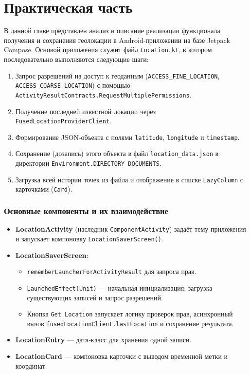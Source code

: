 \chapter*{Практическая часть}

В данной главе представлен анализ и описание реализации функционала получения и сохранения геолокации в Android‑приложении на базе Jetpack Compose. Основой приложения служит файл \texttt{Location.kt}, в котором последовательно выполняются следующие шаги:

\begin{enumerate}
    \item Запрос разрешений на доступ к геоданным (\texttt{ACCESS\_FINE\_LOCATION}, \texttt{ACCESS\_COARSE\_LOCATION}) с помощью \texttt{ActivityResultContracts.RequestMultiplePermissions}.
    \item Получение последней известной локации через \texttt{FusedLocationProviderClient}.
    \item Формирование JSON‑объекта с полями \texttt{latitude}, \texttt{longitude} и \texttt{timestamp}\cite{json_android}.
    \item Сохранение (дозапись) этого объекта в файл \texttt{location\_data.json} в директории \texttt{Environment.DIRECTORY\_DOCUMENTS}.
    \item Загрузка всей истории точек из файла и отображение в списке \texttt{LazyColumn} с карточками (\texttt{Card}).
\end{enumerate}

\subsection*{Основные компоненты и их взаимодействие}

\begin{itemize}
    \item \textbf{LocationActivity} (наследник \texttt{ComponentActivity}) задаёт тему приложения и запускает компоновку \texttt{LocationSaverScreen()}.
    \item \textbf{LocationSaverScreen}:
    \begin{itemize}
        \item \texttt{rememberLauncherForActivityResult} для запроса прав.
        \item \texttt{LaunchedEffect(Unit)} — начальная инициализация: загрузка существующих записей и запрос разрешений.
        \item Кнопка \texttt{Get Location} запускает логику проверок прав, асинхронный вызов \texttt{fusedLocationClient.lastLocation} и сохранение результата.
    \end{itemize}
    \item \textbf{LocationEntry} — дата‑класс для хранения одной записи.
    \item \textbf{LocationCard} — компоновка карточки с выводом временной метки и координат.
\end{itemize}

